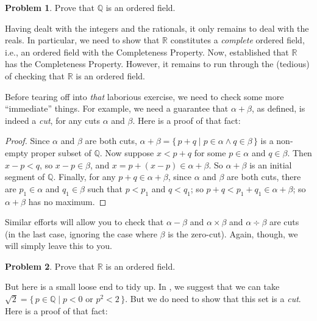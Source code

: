 \documentclass[10pt,a4paper]{article}
\makeatletter
\theoremstyle{plain}
\theoremstyle{definition}
\newtheorem{prob}{Problem}[section]
\theoremstyle{remark}
\newcommand{\olref}{\@ifnextchar[{\olref@i}{\olref@final}}
\def\olref@i[#1]{\@ifnextchar[{\olref@ii}{\olref@final}}
\def\olref@ii[#1]{\@ifnextchar[{\olref@iii}{\olref@final}}
\def\olref@iii[#1]{\olref@final}
\def\olref@final#1{\ref{#1}}
\providecommand{\Rat}{\mathbb{Q}}
\providecommand{\Real}{\mathbb{R}}
\providecommand{\Setabs}[2]{\{\, #1 \mid #2 \,\}}
\makeatother
\begin{document}
\begin{prob}
Prove that $\Rat$ is an ordered field.
\end{prob}

Having dealt with the integers and the rationals, it only remains to
deal with the reals. In particular, we need to show that $\Real$
constitutes a \emph{complete} ordered field, i.e., an ordered field
with the Completeness Property. Now, \olref[cuts]{realcompleteness}
established that $\Real$ has the Completeness Property. However, it
remains to run through the (tedious) of checking that $\Real$ is an
ordered field. 

Before tearing off into \emph{that} laborious exercise, we need to
check some more ``immediate'' things. For example, we need a guarantee
that $\alpha + \beta$, as defined, is indeed a \emph{cut}, for any
cuts $\alpha$ and $\beta$. Here is a proof of that fact:

\begin{proof}	
Since $\alpha$ and $\beta$ are both cuts, $\alpha + \beta = \Setabs{p
+ q}{p \in \alpha \land q \in \beta}$ is a non-empty proper subset of
$\Rat$. Now suppose $x < p + q$ for some $p \in \alpha$ and $q \in \beta$.
Then $x - p < q$, so $x - p \in \beta$, and $x = p + (x - p) \in
\alpha + \beta$. So $\alpha + \beta$ is an initial segment of $\Rat$.
Finally, for any $p + q \in \alpha + \beta$, since $\alpha$ and
$\beta$ are both cuts, there are $p_1 \in \alpha$ and $q_1 \in \beta$
such that $p < p_1$ and $q < q_1$; so $p + q < p_1 + q_1 \in \alpha +
\beta$; so $\alpha + \beta$ has no maximum. 
\end{proof}

Similar efforts will allow you to check that $\alpha - \beta$ and
$\alpha \times \beta$ and $\alpha \div \beta$ are cuts (in the last
case, ignoring the case where $\beta$ is the zero-cut). Again, though,
we will simply leave this to you. 

\begin{prob}
Prove that $\Real$ is an ordered field.
\end{prob}

But here is a small loose end to tidy up. In
\olref[cuts]{sec}, we suggest that we can take $\sqrt{2} =
\Setabs{p \in \Rat}{p < 0 \text{ or }p^2 < 2}$. But we do need to show
that this set is a \emph{cut}. Here is a proof of that fact:
\end{document}
